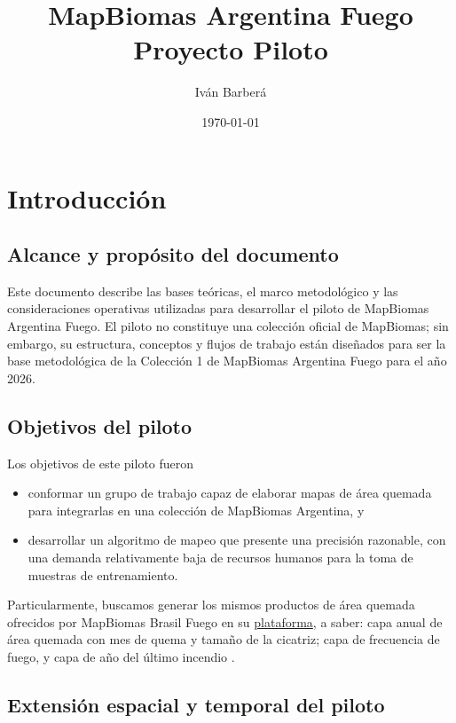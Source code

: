 \documentclass[11pt,a4paper]{article}
\title{MapBiomas Argentina Fuego \\ \large Proyecto Piloto}
\author{Iván Barberá}
\date{\today}
\begin{document}


\tableofcontents

\newpage

\section{Introducción}

\subsection{Alcance y propósito del documento}

Este documento describe las bases teóricas, el marco metodológico y las consideraciones operativas utilizadas para desarrollar el piloto de MapBiomas Argentina Fuego. El piloto no constituye una colección oficial de MapBiomas; sin embargo, su estructura, conceptos y flujos de trabajo están diseñados para ser la base metodológica de la Colección 1 de MapBiomas Argentina Fuego para el año 2026.

\subsection{Objetivos del piloto}

Los objetivos de este piloto fueron

\begin{itemize}
  \item conformar un grupo de trabajo capaz de elaborar mapas de área quemada para integrarlas en una colección de MapBiomas Argentina, y
  \item desarrollar un algoritmo de mapeo que presente una precisión razonable, con una demanda relativamente baja de recursos humanos para la toma de muestras de entrenamiento.
\end{itemize}

Particularmente, buscamos generar los mismos productos de área quemada ofrecidos por MapBiomas Brasil Fuego en su \href{https://plataforma.brasil.mapbiomas.org/fire/fire_total_burned?tl[id]=4&tl[themeKey]=fire&tl[subthemeKey]=fire_total_burned&tl[legendKey]=fire_total_burned_mapbiomas_total_burned&tl[year]=2024&tl[pixelValues][]=1&t[regionKey]=brazil&t[ids][]=1-1-1&t[divisionCategoryId]=4}{plataforma}, a saber: capa anual de área quemada con mes de quema y tamaño de la cicatriz; capa de frecuencia de fuego, y capa de año del último incendio \parencite{alencar2022mapbiomas_fire}.

\subsection{Extensión espacial y temporal del piloto}
\end{document}
